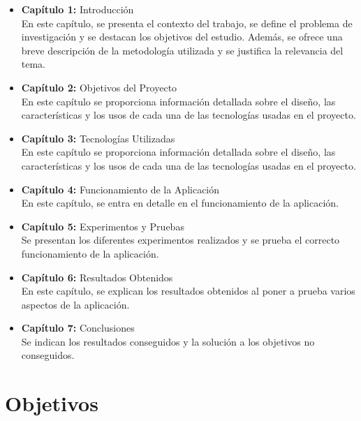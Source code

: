 \documentclass[a4paper, 12pt]{book}
\begin{document}
\begin{itemize}
  \item \textbf{Capítulo 1:} Introducción \\
  En este capítulo, se presenta el contexto del trabajo, se define el problema de 
  investigación y se destacan los objetivos del estudio. Además, se ofrece una breve 
  descripción de la metodología utilizada y se justifica la relevancia del tema.
  \item \textbf{Capítulo 2:} Objetivos del Proyecto \\
  En este capítulo se proporciona información detallada sobre el diseño, las 
  características y los usos de cada una de las tecnologías usadas en el proyecto. 

  \item \textbf{Capítulo 3:} Tecnologías Utilizadas \\
  En este capítulo se proporciona información detallada sobre el diseño, las 
  características y los usos de cada una de las tecnologías usadas en el proyecto.

  \item \textbf{Capítulo 4:} Funcionamiento de la Aplicación \\
  En este capítulo, se entra en detalle en el funcionamiento de la aplicación.

  \item \textbf{Capítulo 5:} Experimentos y Pruebas \\
  Se presentan los diferentes experimentos realizados y se prueba el correcto funcionamiento de la aplicación.

  \item \textbf{Capítulo 6:} Resultados Obtenidos \\
  En este capítulo, se explican los resultados obtenidos al poner a prueba varios aspectos de la aplicación.

  \item \textbf{Capítulo 7:} Conclusiones \\
  Se indican los resultados conseguidos y la solución a los objetivos no conseguidos.
\end{itemize}



\cleardoublepage %
\chapter{Objetivos} %
\label{chap:objetivos} %
\end{document}
